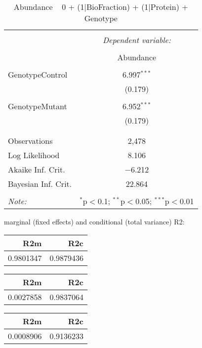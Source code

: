 \documentclass[11pt]{report}
\begin{document}
\begin{table}[!htbp] \centering 
  \caption{Abundance ~ 0 + (1|BioFraction) + (1|Protein) + Genotype} 
  \label{} 
\begin{tabular}{@{\extracolsep{5pt}}lc} 
\\[-1.8ex]\hline 
\hline \\[-1.8ex] 
 & \multicolumn{1}{c}{\textit{Dependent variable:}} \\ 
\cline{2-2} 
\\[-1.8ex] & Abundance \\ 
\hline \\[-1.8ex] 
 GenotypeControl & 6.997$^{***}$ \\ 
  & (0.179) \\ 
  & \\ 
 GenotypeMutant & 6.952$^{***}$ \\ 
  & (0.179) \\ 
  & \\ 
\hline \\[-1.8ex] 
Observations & 2,478 \\ 
Log Likelihood & 8.106 \\ 
Akaike Inf. Crit. & $-$6.212 \\ 
Bayesian Inf. Crit. & 22.864 \\ 
\hline 
\hline \\[-1.8ex] 
\textit{Note:}  & \multicolumn{1}{r}{$^{*}$p$<$0.1; $^{**}$p$<$0.05; $^{***}$p$<$0.01} \\ 
\end{tabular} 
\end{table} 
marginal (fixed effects) and conditional (total variance) R2:

\begin{tabular}{r|r}
\hline
R2m & R2c\\
\hline
0.9801347 & 0.9879436\\
\hline
\end{tabular}

\begin{tabular}{r|r}
\hline
R2m & R2c\\
\hline
0.0027858 & 0.9837064\\
\hline
\end{tabular}

\begin{tabular}{r|r}
\hline
R2m & R2c\\
\hline
0.0008906 & 0.9136233\\
\hline
\end{tabular}
\end{document}
